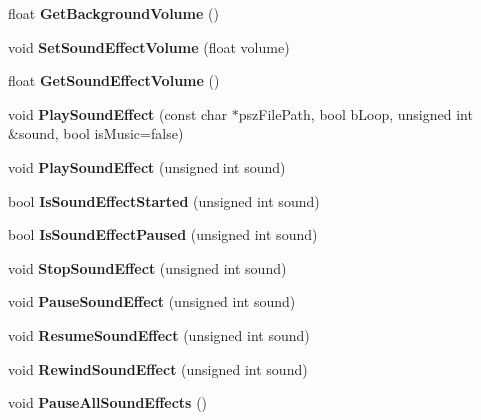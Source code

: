 \begin{DoxyCompactItemize}
float {\bfseries Get\+Background\+Volume} ()
\item 
\mbox{\label{classAudio_a8f2004ed4e6e338b625d2657eff5abb5}} 
void {\bfseries Set\+Sound\+Effect\+Volume} (float volume)
\item 
\mbox{\label{classAudio_ab6a5f3724d7b87838a7881e2a9aa5629}} 
float {\bfseries Get\+Sound\+Effect\+Volume} ()
\item 
\mbox{\label{classAudio_a2b0031304a668114b79d97c0ee453d65}} 
void {\bfseries Play\+Sound\+Effect} (const char $\ast$psz\+File\+Path, bool b\+Loop, unsigned int \&sound, bool is\+Music=false)
\item 
\mbox{\label{classAudio_a746409db5a8474fedf46824722aad8cd}} 
void {\bfseries Play\+Sound\+Effect} (unsigned int sound)
\item 
\mbox{\label{classAudio_accce27fe5781c9cb2c2d646f6bd86a8e}} 
bool {\bfseries Is\+Sound\+Effect\+Started} (unsigned int sound)
\item 
\mbox{\label{classAudio_a711ded36498e6ebea4a5b06e0d73edba}} 
bool {\bfseries Is\+Sound\+Effect\+Paused} (unsigned int sound)
\item 
\mbox{\label{classAudio_a38c90ca893e1397827bd10b4c99cee56}} 
void {\bfseries Stop\+Sound\+Effect} (unsigned int sound)
\item 
\mbox{\label{classAudio_ae2f138e9605d9bbfb77035d04b69962f}} 
void {\bfseries Pause\+Sound\+Effect} (unsigned int sound)
\item 
\mbox{\label{classAudio_abf92ba47cc071f8effa0c6cb7689c3bb}} 
void {\bfseries Resume\+Sound\+Effect} (unsigned int sound)
\item 
\mbox{\label{classAudio_a962a1556c4b9e1b7375d2dd5935314ef}} 
void {\bfseries Rewind\+Sound\+Effect} (unsigned int sound)
\item 
\mbox{\label{classAudio_a6def6b283db6e36cd0f0a9751a7d0750}} 
void {\bfseries Pause\+All\+Sound\+Effects} ()
\item 

\end{DoxyCompactItemize}
